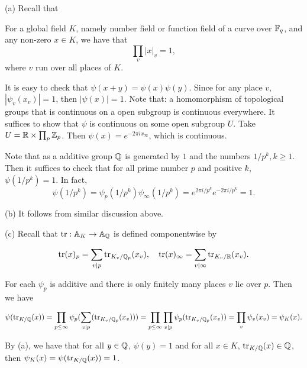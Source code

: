 \begin{solution}
  (a) Recall that
  \begin{theorem}
    For a global field $K$, namely number field or function field of a curve over $\mathbb{F}_q$, and
    any non-zero $x \in K$, we have that
    \[ \prod_{v} |x|_v = 1, \]
    where $v$ run over all places of $K$.
  \end{theorem}

  It is easy to check that $\psi(x + y) = \psi(x) \psi(y)$. Since
  for any place $v$, $|\psi_v(x_v)| = 1$, then $|\psi(x)| = 1$.
  Note that: a homomorphism of topological groups that is continuous
  on a open subgroup is continuous everywhere. It suffices to show that
  $\psi$ is continuous on some open subgroup $U$.
  Take $U = \mathbb{R} \times \prod_{p} \mathbb{Z}_p$. Then $\psi(x) = e^{-2\pi i x_\infty}$,
  which is continuous.

  Note that as a additive group $\mathbb{Q}$ is generated by $1$ and the numbers
  $1/ p ^ k, k \ge 1$. Then it suffices to check that for all prime number $p$ and positive $k$,
  $\psi(1 / p ^ k) = 1$. In fact,
  \[\psi(1 / p ^ k) = \psi_p(1/p^k) \psi_\infty(1 / p^k) =
  e^{2 \pi i /p^k} e^{-2 \pi i /p ^ k } = 1. \]

  (b) It follows from similar discussion above.

  (c) Recall that $\operatorname{tr} : \mathbb{A}_K \to \mathbb{A}_{\mathbb{Q}}$ is defined componentwise by

  \[\operatorname{tr}(x)_p = \sum_{v \mid p} \operatorname{tr}_{K_v/ \mathbb{Q}_p} (x_v), \quad  \operatorname{tr}(x)_\infty =
  \sum_{v \mid \infty} \operatorname{tr}_{K_v/ \mathbb{R}} (x _v). \]

  For each $\psi_p$ is additive and there is only finitely many places $v$ lie over $p$. Then we have

  \[\psi (\operatorname{tr}_{K/ \mathbb{Q}}(x)) = \prod_{p \le \infty} \psi_p(\sum_{v \mid p}(\operatorname{tr}_{K_v/ \mathbb{Q}_p} (x_v))) =
  \prod_{p \le \infty} \prod_{v \mid p} \psi_p (\operatorname{tr}_{K_v/ \mathbb{Q}_p}(x_v)) = \prod_{v} \psi_v(x_v) = \psi_K(x).
  \]

  By (a), we have that for all $y \in \mathbb{Q}$, $\psi(y) = 1$ and for all $x \in K$,
  $\operatorname{tr}_{K/\mathbb{Q}} (x) \in \mathbb{Q}$, then $\psi_K(x) = \psi(\operatorname{tr}_{K/\mathbb{Q}} (x)) = 1$.
\end{solution}

